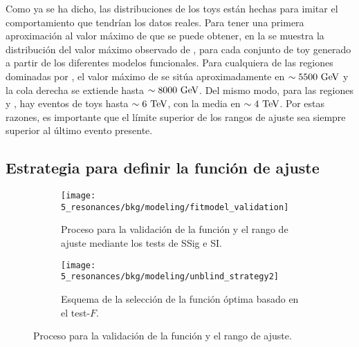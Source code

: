 Como ya se ha dicho, las distribuciones de los toys están hechas para imitar el comportamiento que tendrían los datos reales. Para tener una primera aproximación al valor máximo de \myj que se puede obtener, en la \Fig{\ref{fig:bkg:modeling:preparation:toys:toys_maximums}} se muestra la distribución del valor máximo observado de \myj, para cada conjunto de toy generado a partir de los diferentes modelos funcionales. Para cualquiera de las regiones dominadas por \ljets, el valor máximo de \myj se sitúa aproximadamente en \(\sim 5500~\text{GeV}\) y la cola derecha se extiende hasta \(\sim 8000~\text{GeV}\). Del mismo modo, para las regiones \cjets y \bjets, hay eventos de toys hasta \(\sim 6~\text{TeV}\), con la media en \(\sim 4~\text{TeV}\). Por estas razones, es importante que el límite superior de los rangos de ajuste sea siempre superior al último evento presente.
























\subsection{Estrategia para definir la función de ajuste}
\label{subsec:bkg:modeling:strategy}


\begin{figure}[ht!]
    \centering
    \begin{subfigure}[t]{0.49\linewidth}
        \centering
        \texttt{[image: 5\_resonances/bkg/modeling/fitmodel\_validation]}
        \caption{Proceso para la validación de la función y el rango de ajuste mediante los tests de \ac{SSig} e \ac{SI}.}
        \label{fig:bkg:modeling:strategy:validation:tests}
    \end{subfigure}
    \hfill
    \begin{subfigure}[t]{0.49\linewidth}
        \centering
        \texttt{[image: 5\_resonances/bkg/modeling/unblind\_strategy2]}
        \caption{Esquema de la selección de la función óptima basado en el test-\(F\).}
        \label{fig:bkg:modeling:strategy:validation:function_selection}
    \end{subfigure}
    \caption{Proceso para la validación de la función y el rango de ajuste.}
    \label{fig:bkg:modeling:strategy:validation}
\end{figure}

